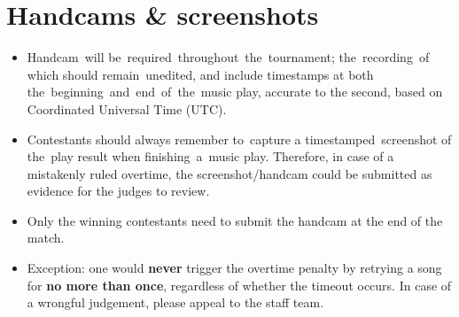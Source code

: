 \documentclass{article}
\begin{document}
\section{Handcams \& screenshots}
\begin{itemize}
	\item Handcam will be required throughout the tournament;
	      the recording of which should remain unedited,
	      and include timestamps
	      at both the beginning and end of the music play,
	      accurate to the second,
	      based on Coordinated Universal Time (UTC).

	\item Contestants should always remember to capture
	      a timestamped screenshot of the play result
	      when finishing a music play.
	      Therefore, in case of a mistakenly ruled overtime,
	      the screenshot/handcam could be
	      submitted as evidence for the judges to review.

	\item Only the winning contestants need to submit the handcam
	      at the end of the match.

	\item Exception: one would \textbf{never}
	      trigger the overtime penalty
	      by retrying a song
	      for \textbf{no more than once},
	      regardless of whether the timeout occurs.
	      In case of a wrongful judgement,
	      please appeal to the staff team.
\end{itemize}
\end{document}
